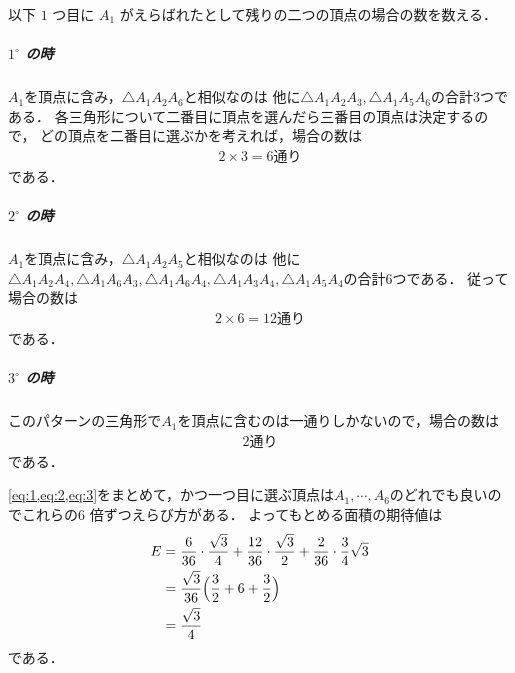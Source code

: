 \documentclass[../../main.tex]{subfiles}
\begin{document}
以下 $1$ つ目に $A_1$ がえらばれたとして残りの二つの頂点の場合の数を数える．

\subparagraph{$1^\circ$ の時}

$A_1$を頂点に含み，$\triangle A_1 A_2 A_6$と相似なのは
他に$\triangle A_1A_2A_3, \triangle A_1A_5A_6$の合計$3$つである．
各三角形について二番目に頂点を選んだら三番目の頂点は決定するので，
どの頂点を二番目に選ぶかを考えれば，場合の数は
\begin{align}
  2 \times 3 = 6 \text{通り} \label{eq:1}
\end{align}
である．

\subparagraph{$2^\circ$ の時}

$A_1$を頂点に含み，$\triangle A_1 A_2 A_5$と相似なのは
他に$\triangle A_1A_2A_4, \triangle A_1A_6A_3, \triangle A_1A_6A_4, \triangle A_1A_3A_4, \triangle A_1A_5A_4$の合計$6$つである．
従って場合の数は
\begin{align}
  2 \times 6 = 12 \text{通り} \label{eq:2}
\end{align}
である．

\subparagraph{$3^\circ$ の時}

このパターンの三角形で$A_1$を頂点に含むのは一通りしかないので，場合の数は
\begin{align}
  2 \text{通り} \label{eq:3}
\end{align}
である．
\casesend

\cref{eq:1,eq:2,eq:3}をまとめて，かつ一つ目に選ぶ頂点は$A_1,\cdots,A_6$のどれでも良いのでこれらの$6$ 倍ずつえらび方がある．
よってもとめる面積の期待値は
\begin{align}
  E
  &= \dfrac{6}{36} \cdot \dfrac{\sqrt{3}}{4} + \dfrac{12}{36} \cdot \dfrac{\sqrt{3}}{2} + \dfrac{2}{36} \cdot \dfrac{3}{4}\sqrt{3} \\
  &= \dfrac{\sqrt{3}}{36} \Bigl( \dfrac{3}{2} + 6 + \dfrac{3}{2} \Bigr) \\
  &= \dfrac{\sqrt{3}}{4}
\end{align}
である．

\end{document}
